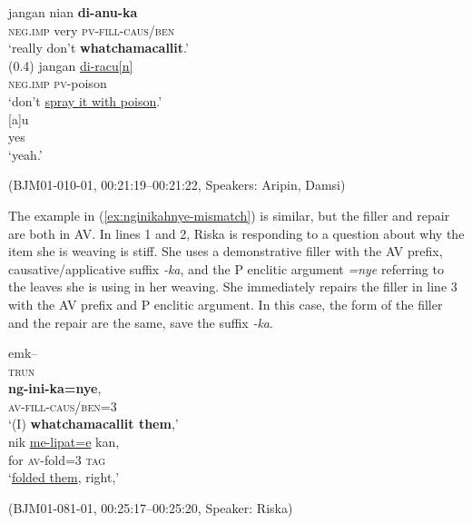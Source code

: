 \documentclass[output=paper,
\ChapterDOI{10.5281/zenodo.15697583}
colorlinks,
citecolor=brown]{langscibook}
\begin{document}
\begin{exe}
\ex\label{ex:dianuka-mismatch}
\begin{xlist}[0\quad →A:]
\gll jangan nian \textbf{di-anu-ka}\\
\textsc{neg.imp} very \textsc{pv-fill-caus/ben}\\
\glt `really don't \textbf{whatchamacallit}.' \\
\exi{} (0.4)
\gll jangan \uline{di-racu[n]}\\
\textsc{neg.imp} \textsc{pv}-poison\\
\glt `don't \uline{spray it with poison}.' \\
\gll \hspace{2.4cm}[a]u\\
\hspace{2.4cm}yes\\
\glt \hspace{2.4cm}`yeah.' \\
\end{xlist}
\hfill (BJM01-010-01, 00:21:19--00:21:22, Speakers: Aripin, Damsi)
\end{exe}

The example in (\ref{ex:nginikahnye-mismatch}) is similar, but the filler and repair are both in AV. In lines 1 and 2, Riska is responding to a question about why the item she is weaving is stiff. She uses a demonstrative filler with the AV prefix, causative/applicative suffix \textit{-ka}, and the P enclitic argument \textit{=nye} referring to the leaves she is using in her weaving. She immediately repairs the filler in line 3 with the AV prefix and P enclitic argument. In this case, the form of the filler and the repair are the same, save the suffix \textit{-ka}.

\begin{exe}
\ex\label{ex:nginikahnye-mismatch}
\begin{xlist}[0\quad →A:]
\gll emk--\\
\textsc{trun}\\
\gll \textbf{ng-ini-ka=nye},\\
\textsc{av-fill-caus/ben}=3\\
\glt `(I) \textbf{whatchamacallit them},' \\
\exi{3\quad \hphantom{→A:}}
\gll nik \uline{me-lipat=e} kan,\\
for \textsc{av}-fold=\textsc{3} \textsc{tag}\\
\glt `\uline{folded them}, right,' \\
\end{xlist}
\hfill (BJM01-081-01, 00:25:17--00:25:20, Speaker: Riska)
\end{exe}
\end{document}
